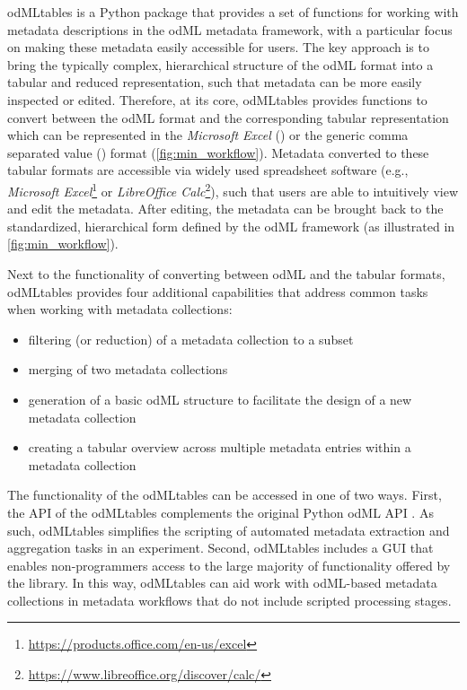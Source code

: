 odMLtables is a Python package that provides a set of functions for working with metadata descriptions in the odML metadata framework, with a particular focus on making these metadata easily accessible for users. The key approach is to bring the typically complex, hierarchical structure of the odML format into a tabular and reduced  representation, such that metadata can be more easily inspected or edited. Therefore, at its core, odMLtables provides functions to convert between the odML format and the corresponding tabular representation which can be represented in the \textit{Microsoft Excel} () or the generic comma separated value () format (\cref{fig:min_workflow}). Metadata converted to these tabular formats are accessible via widely used spreadsheet software (e.g., \textit{Microsoft Excel}\footnote{\url{https://products.office.com/en-us/excel}} or \textit{LibreOffice Calc}\footnote{\url{https://www.libreoffice.org/discover/calc/}}), such that users are able to intuitively view and edit the metadata. After editing, the metadata can be brought back to the standardized, hierarchical form defined by the odML framework (as illustrated in \cref{fig:min_workflow}).

Next to the functionality of converting between odML and the tabular formats, odMLtables provides four additional capabilities that address common tasks when working with metadata collections:
\begin{itemize}
    \item filtering (or reduction) of a metadata collection to a subset
    \item merging of two metadata collections
    \item generation of a basic odML structure to facilitate the design of a new metadata collection
    \item creating a tabular overview across multiple metadata entries within a metadata collection
\end{itemize}

The functionality of the odMLtables can be accessed in one of two ways. First, the API of the odMLtables complements the original Python odML API \citep{Grewe_2011}. As such, odMLtables simplifies the scripting of automated metadata extraction and aggregation tasks in an experiment. Second, odMLtables includes a GUI that enables non-programmers access to the large majority of functionality offered by the library. In this way, odMLtables can aid work with odML-based metadata collections in metadata workflows that do not include scripted processing stages.

